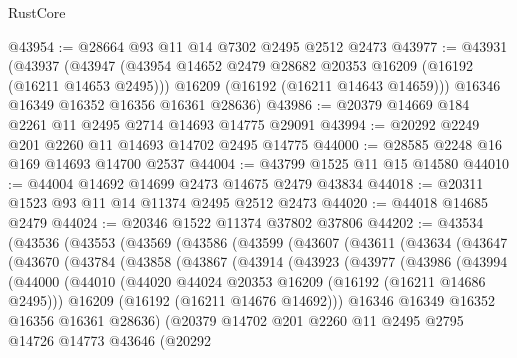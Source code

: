 \begin{lexlean}{RustCore}
\begin{coremodule}
@43954 := @28664 @93 @11 @14 @7302 @2495 @2512 @2473
@43977 := @43931
    (@43937
      (@43947
        (@43954 @14652 @2479 @28682 @20353 @16209 (@16192 (@16211 @14653 @2495)))
        @16209
        (@16192 (@16211 @14643 @14659)))
      @16346
      @16349
      @16352
      @16356
      @16361
      @28636)
@43986 := @20379 @14669 @184 @2261 @11 @2495 @2714 @14693 @14775 @29091
@43994 := @20292 @2249 @201 @2260 @11 @14693 @14702 @2495 @14775
@44000 := @28585 @2248 @16 @169 @14693 @14700 @2537
@44004 := @43799 @1525 @11 @15 @14580
@44010 := @44004 @14692 @14699 @2473 @14675 @2479 @43834
@44018 := @20311 @1523 @93 @11 @14 @11374 @2495 @2512 @2473
@44020 := @44018 @14685 @2479
@44024 := @20346 @1522 @11374 @37802 @37806
@44202 := @43534
    (@43536
      (@43553
        (@43569
          (@43586
            (@43599
              (@43607
                (@43611
                  (@43634
                    (@43647
                      (@43670
                        (@43784
                          (@43858
                            (@43867
                              (@43914
                                (@43923
                                  (@43977
                                    (@43986
                                      (@43994
                                        (@44000
                                          (@44010
                                            (@44020
                                              @44024
                                              @20353
                                              @16209
                                              (@16192 (@16211 @14686 @2495)))
                                            @16209
                                            (@16192 (@16211 @14676 @14692)))
                                          @16346
                                          @16349
                                          @16352
                                          @16356
                                          @16361
                                          @28636)
                                        (@20379
                                          @14702
                                          @201
                                          @2260
                                          @11
                                          @2495
                                          @2795
                                          @14726
                                          @14773
                                          @43646
                                          (@20292

\end{coremodule}
\end{lexlean}
